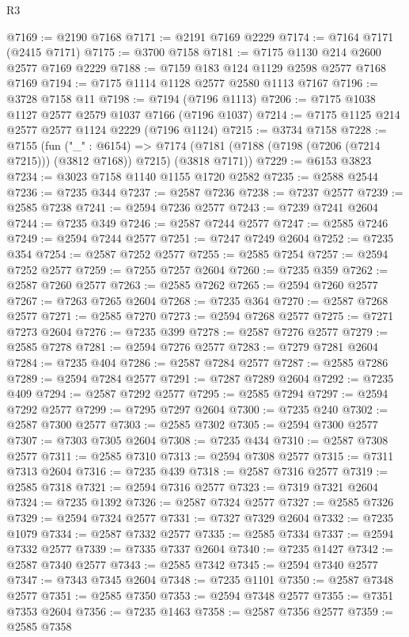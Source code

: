 \begin{lexlean}{R3}
\begin{coremodule}
@7169 := @2190 @7168
@7171 := @2191 @7169 @2229
@7174 := @7164 @7171 (@2415 @7171)
@7175 := @3700 @7158
@7181 := @7175 @1130 @214 @2600 @2577 @7169 @2229
@7188 := @7159 @183 @124 @1129 @2598 @2577 @7168 @7169
@7194 := @7175 @1114 @1128 @2577 @2580 @1113 @7167
@7196 := @3728 @7158 @11
@7198 := @7194 (@7196 @1113)
@7206 := @7175 @1038 @1127 @2577 @2579 @1037 @7166 (@7196 @1037)
@7214 := @7175 @1125 @214 @2577 @2577 @1124 @2229 (@7196 @1124)
@7215 := @3734 @7158
@7228 := @7155
    (fun ("_" : @6154) =>
    @7174 (@7181 (@7188 (@7198 (@7206 (@7214 @7215))) (@3812 @7168)) @7215) (@3818 @7171))
@7229 := @6153 @3823
@7234 := @3023 @7158 @1140 @1155 @1720 @2582
@7235 := @2588 @2544
@7236 := @7235 @344
@7237 := @2587 @7236
@7238 := @7237 @2577
@7239 := @2585 @7238
@7241 := @2594 @7236 @2577
@7243 := @7239 @7241 @2604
@7244 := @7235 @349
@7246 := @2587 @7244 @2577
@7247 := @2585 @7246
@7249 := @2594 @7244 @2577
@7251 := @7247 @7249 @2604
@7252 := @7235 @354
@7254 := @2587 @7252 @2577
@7255 := @2585 @7254
@7257 := @2594 @7252 @2577
@7259 := @7255 @7257 @2604
@7260 := @7235 @359
@7262 := @2587 @7260 @2577
@7263 := @2585 @7262
@7265 := @2594 @7260 @2577
@7267 := @7263 @7265 @2604
@7268 := @7235 @364
@7270 := @2587 @7268 @2577
@7271 := @2585 @7270
@7273 := @2594 @7268 @2577
@7275 := @7271 @7273 @2604
@7276 := @7235 @399
@7278 := @2587 @7276 @2577
@7279 := @2585 @7278
@7281 := @2594 @7276 @2577
@7283 := @7279 @7281 @2604
@7284 := @7235 @404
@7286 := @2587 @7284 @2577
@7287 := @2585 @7286
@7289 := @2594 @7284 @2577
@7291 := @7287 @7289 @2604
@7292 := @7235 @409
@7294 := @2587 @7292 @2577
@7295 := @2585 @7294
@7297 := @2594 @7292 @2577
@7299 := @7295 @7297 @2604
@7300 := @7235 @240
@7302 := @2587 @7300 @2577
@7303 := @2585 @7302
@7305 := @2594 @7300 @2577
@7307 := @7303 @7305 @2604
@7308 := @7235 @434
@7310 := @2587 @7308 @2577
@7311 := @2585 @7310
@7313 := @2594 @7308 @2577
@7315 := @7311 @7313 @2604
@7316 := @7235 @439
@7318 := @2587 @7316 @2577
@7319 := @2585 @7318
@7321 := @2594 @7316 @2577
@7323 := @7319 @7321 @2604
@7324 := @7235 @1392
@7326 := @2587 @7324 @2577
@7327 := @2585 @7326
@7329 := @2594 @7324 @2577
@7331 := @7327 @7329 @2604
@7332 := @7235 @1079
@7334 := @2587 @7332 @2577
@7335 := @2585 @7334
@7337 := @2594 @7332 @2577
@7339 := @7335 @7337 @2604
@7340 := @7235 @1427
@7342 := @2587 @7340 @2577
@7343 := @2585 @7342
@7345 := @2594 @7340 @2577
@7347 := @7343 @7345 @2604
@7348 := @7235 @1101
@7350 := @2587 @7348 @2577
@7351 := @2585 @7350
@7353 := @2594 @7348 @2577
@7355 := @7351 @7353 @2604
@7356 := @7235 @1463
@7358 := @2587 @7356 @2577
@7359 := @2585 @7358

\end{coremodule}
\end{lexlean}
